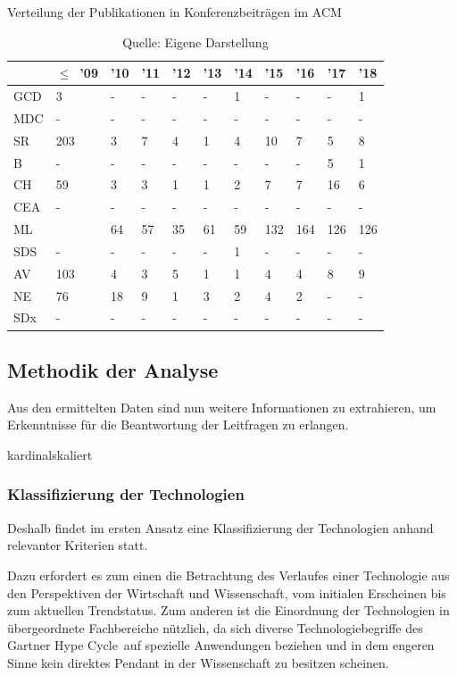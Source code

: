 \begin{table}
\caption{Verteilung der Publikationen in Konferenzbeiträgen im \glqq ACM\grqq}
\centering
\label{tab:dist_acm_proc}
\begin{tabularx}{\linewidth}{X|X|X|X|X|X|X|X|X|X|X}
	& $\leq$~'09 & '10 & '11 & '12 & '13 & '14 & '15 & '16 & '17 & '18 \\
	\hline
	GCD & 3 & - & - & - & - & 1 & - & - & - & 1 \\
	\hline
	MDC & - & - & - & - & - & - & - & - & - & - \\
	\hline
	SR & 203 & 3 & 7 & 4 & 1 & 4 & 10 & 7 & 5 & 8 \\
	\hline
	B & - & - & - & - & - & - & - & - & 5 & 1 \\
	\hline
	CH & 59 & 3 & 3 & 1 & 1 & 2 & 7 & 7 & 16 & 6 \\
	\hline
	CEA & - & - & - & - & - & - & - & - & - & - \\
	\hline
	ML & \numprint{2042} & 64 & 57 & 35 & 61 & 59 & 132 & 164 & 126 & 126 \\
	\hline
	SDS & - & - & - & - & - & 1 & - & - & - & - \\
	\hline
	AV & 103 & 4 & 3 & 5 & 1 & 1 & 4 & 4 & 8 & 9 \\
	\hline
	NE & 76 & 18 & 9 & 1 & 3 & 2 & 4 & 2 & - & - \\
	\hline
	SDx & - & - & - & - & - & - & - & - & - & - \\
\end{tabularx}
\caption*{Quelle: Eigene Darstellung}
\end{table}


\subsection{Methodik der Analyse}
Aus den ermittelten Daten sind nun weitere Informationen zu extrahieren, um Erkenntnisse für die Beantwortung der Leitfragen zu erlangen.

kardinalskaliert

\subsubsection{Klassifizierung der Technologien}
Deshalb findet im ersten Ansatz eine Klassifizierung der Technologien anhand relevanter Kriterien statt.

Dazu erfordert es zum einen die Betrachtung des Verlaufes einer Technologie aus den Perspektiven der Wirtschaft und Wissenschaft, vom initialen Erscheinen bis zum aktuellen Trendstatus. Zum anderen ist die Einordnung der Technologien in übergeordnete Fachbereiche nützlich, da sich diverse Technologiebegriffe des \glqq Gartner Hype Cycle\grqq~auf spezielle Anwendungen beziehen und in dem engeren Sinne kein direktes Pendant in der Wissenschaft zu besitzen scheinen.


